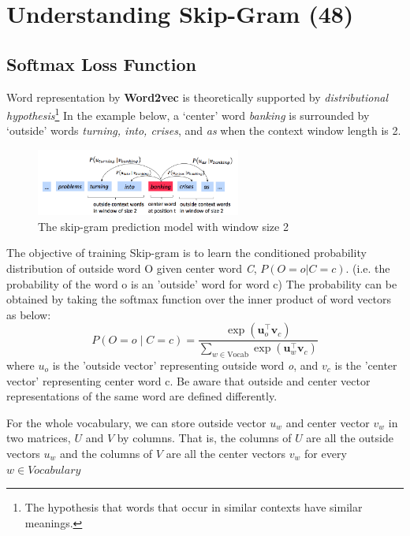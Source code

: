 \documentclass{assignment format}
\begin{document}
\section{Understanding Skip-Gram (48)}

\subsection{Softmax Loss Function}
Word representation by \textbf{Word2vec} is theoretically supported by  \textit{distributional hypothesis}\footnote{The hypothesis that words that occur in similar contexts have similar meanings.} In the example below, a `center' word \textit{banking} is surrounded by `outside' words \textit{turning, into, crises}, and \textit{as} when the context window length is 2.

\begin{figure}[h]
    \centering
    \includegraphics[width=0.6\textwidth]{word2vec.png}
    \caption{The skip-gram prediction model with window size 2}
    \label{fig:word2vec}
\end{figure}
The objective of training Skip-gram is to learn the conditioned probability distribution of outside word {O} given center word \textit{C}, $P(O=o|C=c)$. (i.e. the probability of the word o is an 'outside' word for word c)
The probability can be obtained by taking the softmax function over the inner product of word vectors as below:
\begin{equation}
 P(O=o \mid C=c) = \frac{\exp(\bm u_{o}^\top \bm v_c)}{\sum_{w \in \text{Vocab}} \exp(\bm u_{w}^\top \bm v_c)}
 \label{word2vec_condprob}
\end{equation}
where $u_o$ is the 'outside vector' representing outside word \textit{o}, and $v_c$ is the 'center vector' representing center word c. Be aware that outside and center vector representations of the same word are defined differently.

For the whole vocabulary, we can store outside vector $u_w$ and center vector $v_w$ in two matrices, $U$ and $V$ by columns. That is, the columns of $U$ are all the outside vectors $u_w$ and the columns of $V$ are all the center vectors $v_w$ for every $w \in Vocabulary$


\end{document}
